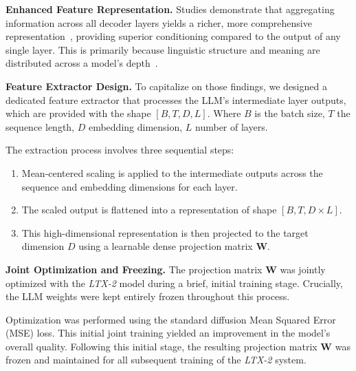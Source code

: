 \documentclass{article}
\begin{document}
\textbf{Enhanced Feature Representation.}
Studies demonstrate that aggregating information across all decoder layers yields a richer, more comprehensive representation~\cite{fibo2025,liu2024playground,wang2025comprehensive}, providing superior conditioning compared to the output of any single layer. This is primarily because linguistic structure and meaning are distributed across a model's depth~\cite{dar2023analyzing,skean2025layer}.

\textbf{Feature Extractor Design.}
To capitalize on those findings, we designed a dedicated feature extractor that processes the LLM's intermediate layer outputs, which are provided with the shape $[B, T, D, L]$. Where $B$ is the batch size, $T$ the sequence length, $D$ embedding dimension, $L$ number of layers.

The extraction process involves three sequential steps:
\begin{enumerate}
    \item Mean-centered scaling is applied to the intermediate outputs across the sequence and embedding dimensions for each layer.
    \item The scaled output is flattened into a representation of shape $\left[B, T, D \times L\right]$.
    \item This high-dimensional representation is then projected to the target dimension $D$ using a learnable dense projection matrix $\boldsymbol{W}$.
\end{enumerate}

\textbf{Joint Optimization and Freezing.}
The projection matrix $\boldsymbol{W}$ was jointly optimized with the \textit{LTX-2} model during a brief, initial training stage. Crucially, the LLM weights were kept entirely frozen throughout this process.

Optimization was performed using the standard diffusion Mean Squared Error (MSE) loss. This initial joint training yielded an improvement in the model's overall quality. Following this initial stage, the resulting projection matrix $\boldsymbol{W}$ was frozen and maintained for all subsequent training of the \textit{LTX-2} system.
\end{document}
